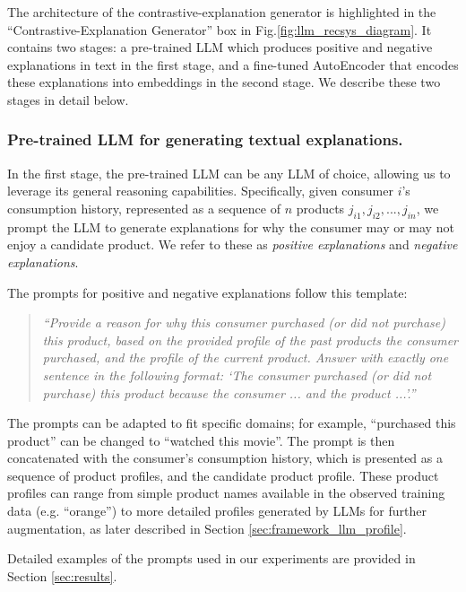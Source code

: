 The architecture of the contrastive-explanation generator is highlighted in the ``Contrastive-Explanation Generator'' box in Fig.\ref{fig:llm_recsys_diagram}. It contains two stages: a pre-trained LLM which produces positive and negative explanations in text in the first stage, and a fine-tuned AutoEncoder that encodes these explanations into embeddings in the second stage. We describe these two stages in detail below.

\subsubsection{Pre-trained LLM for generating textual explanations.}
\label{sec:framework_explanation_generator_pretrainllm}

In the first stage, the pre-trained LLM can be any LLM of choice, allowing us to leverage its general reasoning capabilities. Specifically, given consumer $i$'s consumption history, represented as a sequence of $n$ products $j_{i1}, j_{i2}, ..., j_{in}$, we prompt the LLM to generate explanations for why the consumer may or may not enjoy a candidate product. We refer to these as \emph{positive explanations} and \emph{negative explanations}.

The prompts for positive and negative explanations follow this template: 
\begin{quote}
\emph{
``Provide a reason for why this consumer purchased (or did not purchase) this product, based on the provided profile of the past products the consumer purchased, and the profile of the current product. Answer with exactly one sentence in the following format: `The consumer purchased (or did not purchase) this product because the consumer ... and the product ...'.'' }
\end{quote} 
The prompts can be adapted to fit specific domains; for example, ``purchased this product'' can be changed to ``watched this movie''. The prompt is then concatenated with the consumer's consumption history, which is presented as a sequence of product profiles, and the candidate product profile. These product profiles can range from simple product names available in the observed training data (e.g. ``orange'') to more detailed profiles generated by LLMs for further augmentation, as later described in Section \ref{sec:framework_llm_profile}. 

Detailed examples of the prompts used in our experiments are provided in Section \ref{sec:results}. %

